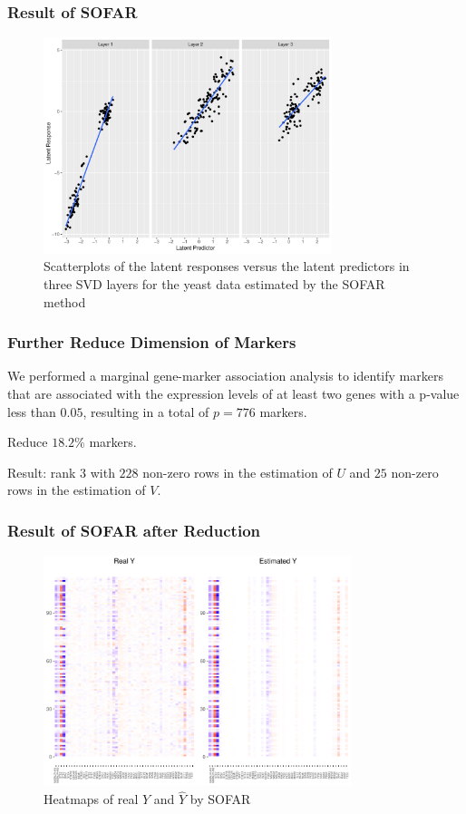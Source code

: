 \begin{frame}
    \frametitle{Result of SOFAR}
    \begin{figure}[h]
        \centering
        \includegraphics[width=0.75\textwidth]{./figs/latent1.pdf}
        \caption{Scatterplots of the latent responses versus the latent predictors in three SVD layers for the yeast data estimated by the SOFAR method}
    \end{figure}
\end{frame}


\begin{frame}
    \frametitle{Further Reduce Dimension of Markers}

    We performed a marginal gene-marker association analysis to identify markers that are associated with the expression levels of at least two genes with a p-value less than $0.05$, resulting in a total of $p = 776$ markers.

    Reduce $18.2\%$ markers.  

    Result: rank $3$ with $228$ non-zero rows in the estimation of $U$ and $25$ non-zero rows in the estimation of $V$. 
\end{frame}


\begin{frame}
    \frametitle{Result of SOFAR after Reduction}
    \begin{figure}[h]
        \centering
        \includegraphics[width=0.8\textwidth]{./figs/heatmap2.pdf}
        \caption{Heatmaps of real $Y$ and $\hat{Y}$ by SOFAR}
    \end{figure}
\end{frame}

